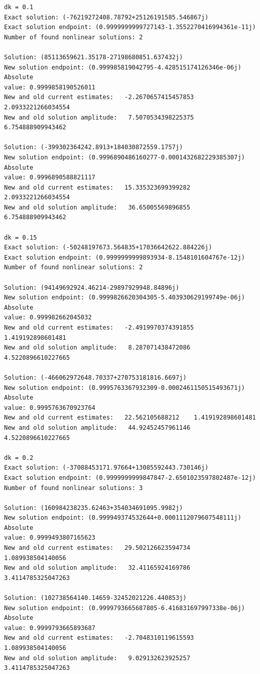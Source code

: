 \documentclass[11pt]{article}
\begin{document}
    \begin{Verbatim}[commandchars=\\\{\}]
dk = 0.1
Exact solution: (-76219272408.78792+25126191585.546867j)
Exact solution endpoint: (0.9999999999727143-1.3552270416994361e-11j)
Number of found nonlinear solutions: 2

Solution: (85113659621.35178-27198680851.637432j)
New solution endpoint: (0.999985819042795-4.428515174126346e-06j) Absolute
value: 0.9999858190526011
New and old current estimates:   -2.2670657415457853    2.0933221266034554
New and old solution amplitude:   7.5070534398225375    6.754888909943462

Solution: (-399302364242.8913+184030872559.1757j)
New solution endpoint: (0.9996890486160277-0.0001432682229385307j) Absolute
value: 0.9996890588821117
New and old current estimates:   15.335323699399282    2.0933221266034554
New and old solution amplitude:   36.65005569896855    6.754888909943462

dk = 0.15
Exact solution: (-50248197673.564835+17036642622.884226j)
Exact solution endpoint: (0.9999999999893934-8.1548101604767e-12j)
Number of found nonlinear solutions: 2

Solution: (94149692924.46214-29897929948.84896j)
New solution endpoint: (0.9999826620304305-5.403930629199749e-06j) Absolute
value: 0.999982662045032
New and old current estimates:   -2.4919970374391855    1.419192898601481
New and old solution amplitude:   8.287071438472086    4.5220896610227665

Solution: (-466062972648.70337+270753181816.6697j)
New solution endpoint: (0.9995763367932309-0.0002461150515493671j) Absolute
value: 0.9995763670923764
New and old current estimates:   22.562105688212    1.419192898601481
New and old solution amplitude:   44.92452457961146    4.5220896610227665

dk = 0.2
Exact solution: (-37088453171.97664+13085592443.730146j)
Exact solution endpoint: (0.9999999999847847-2.6501023597802487e-12j)
Number of found nonlinear solutions: 3

Solution: (160984238235.62463+354034691095.9982j)
New solution endpoint: (0.999949374532644+0.0001112079607548111j) Absolute
value: 0.9999493807165623
New and old current estimates:   29.502126623594734    1.089938504140056
New and old solution amplitude:   32.41165924169786    3.4114785325047263

Solution: (102738564140.14659-32452021226.440853j)
New solution endpoint: (0.9999793665687805-6.416831697997338e-06j) Absolute
value: 0.9999793665893687
New and old current estimates:   -2.7048310119615593    1.089938504140056
New and old solution amplitude:   9.029132623925257    3.4114785325047263


\end{Verbatim}
\end{document}
